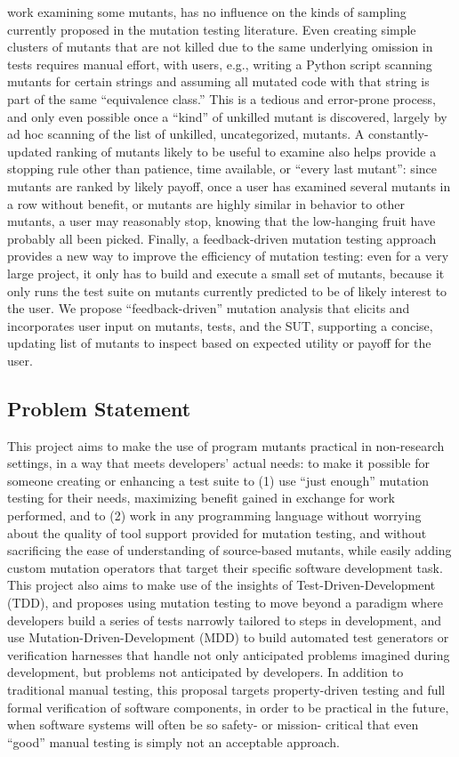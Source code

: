 \begin{itemize}
work examining some mutants, has no influence on the kinds of sampling currently
proposed in the mutation testing literature.  
Even creating simple clusters of
mutants that are not killed due to the same underlying omission in tests
requires manual effort, with users, e.g., writing a Python script scanning
mutants for certain strings and assuming all mutated code with that string is
part of the same ``equivalence class.''  This is a tedious and error-prone
process, and only even possible once a ``kind'' of unkilled mutant is
discovered, largely by ad hoc scanning of the list of unkilled, uncategorized,
mutants.  
A constantly-updated ranking of mutants likely to be useful to examine
also helps provide a stopping rule other than patience, time available, or
``every last mutant'':  since mutants are ranked by likely payoff, once a user
has examined several mutants in a row without benefit, or mutants are highly
similar in behavior to other mutants, a user may reasonably stop, knowing that
the low-hanging fruit have probably all been picked.  Finally, a feedback-driven
mutation testing approach provides a new way to improve the efficiency of
mutation testing:  even for a very large project, it only has to build and
execute a small set of mutants, because it only runs the test suite on mutants
currently predicted to be of likely interest to the user.  
We propose ``feedback-driven'' mutation analysis that elicits and incorporates
user input on mutants, tests, and the SUT, supporting a concise, updating list
of mutants to inspect based on expected utility or payoff for the user.
\end{itemize}


\subsection{Problem Statement}

This project aims to make the use of program mutants practical in non-research settings, in a way that meets developers' actual needs: to make it possible for someone creating or enhancing a test suite to (1) use ``just enough'' mutation testing for their needs, maximizing benefit gained in exchange for work performed, and to (2) work in any programming language without worrying about the quality of tool support provided for mutation testing, and without sacrificing the ease of understanding of source-based mutants, while easily adding custom mutation operators that target their specific software development task.  This project also aims to make use of the insights of Test-Driven-Development (TDD), and proposes using mutation testing to move beyond a paradigm where developers build a series of tests narrowly tailored to steps in development, and use Mutation-Driven-Development (MDD) to build automated test generators or verification harnesses that handle not only anticipated problems imagined during development, but problems not anticipated by developers.  In addition to traditional manual testing, this proposal targets property-driven testing and full formal verification of software components, in order to be practical in the future, when software systems will often be so safety- or mission- critical that even ``good'' manual testing is simply not an acceptable approach.


